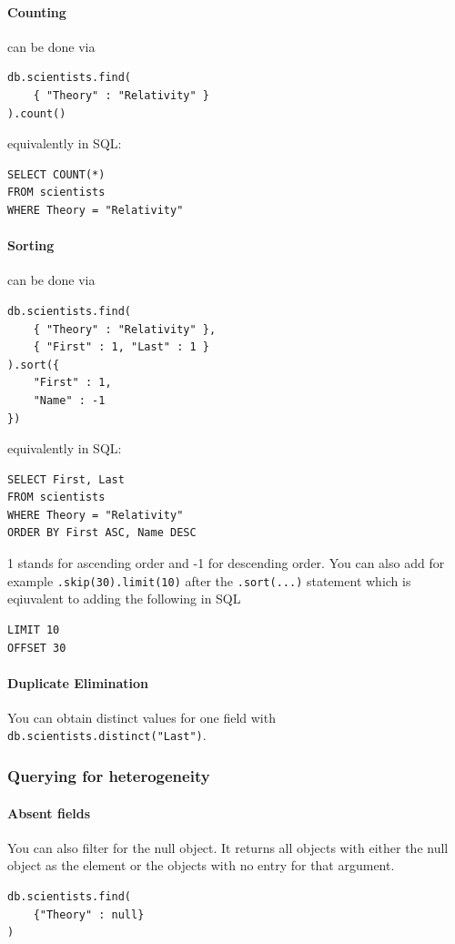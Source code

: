 \paragraph{Counting} can be done via
\begin{lstlisting}[style=neutral]
db.scientists.find(
    { "Theory" : "Relativity" }
).count()
\end{lstlisting}
equivalently in SQL:
\begin{lstlisting}[style=neutral]
SELECT COUNT(*)
FROM scientists
WHERE Theory = "Relativity"
\end{lstlisting}

\paragraph{Sorting} can be done via
\begin{lstlisting}[style=neutral]
db.scientists.find(
    { "Theory" : "Relativity" },
    { "First" : 1, "Last" : 1 }
).sort({
    "First" : 1,
    "Name" : -1
})
\end{lstlisting}
equivalently in SQL:
\begin{lstlisting}[style=neutral]
SELECT First, Last
FROM scientists
WHERE Theory = "Relativity"
ORDER BY First ASC, Name DESC
\end{lstlisting}
1 stands for ascending order and -1 for descending order. You can also add for example \texttt{.skip(30).limit(10)} after the \texttt{.sort(...)} statement which is eqiuvalent to adding the following in SQL
\begin{lstlisting}[style=neutral]
LIMIT 10
OFFSET 30    
\end{lstlisting}

\paragraph{Duplicate Elimination}
You can obtain distinct values for one field with \texttt{db.scientists.distinct("Last")}.


\subsubsection{Querying for heterogeneity}

\paragraph{Absent fields}

You can also filter for the null object. It returns all objects with either the null object as the element or the objects with no entry for that argument.
\begin{lstlisting}[style=neutral]
db.scientists.find(
    {"Theory" : null}
)
\end{lstlisting}

